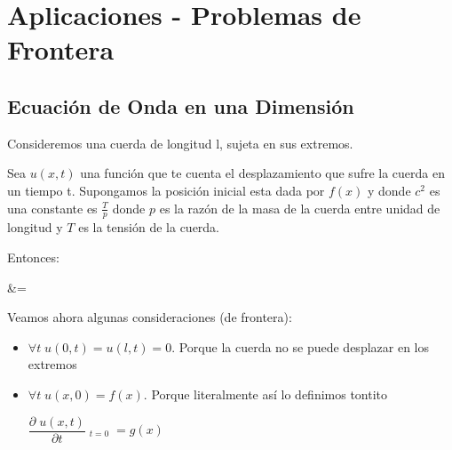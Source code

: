 \documentclass[12pt, fleqn]{report}                             %
\def \Eq {equation}                                             %
\newenvironment{MultiLineEquation*}[1]                          %
        {\begin{\Eq*}\begin{alignedat}{#1}}                         %
        {\end{alignedat}\end{\Eq*}}                                 %
\theoremstyle{break}                                            %
\newcommand \UpperDerivate[3] {\dfrac{d^{#3} \; #1}{d#2^{#3}}}  %
\newcommand \Partial[2] {\dfrac{\partial \; #1}{\partial #2}}   %
\newcommand \UpperPartial[3]                                    %
        {\dfrac{\partial^{#3} \; #1}{\partial#2^{#3}}}              %
\DeclareMathOperator \Evaluate  {\Big|}                         %
\begin{document}
        \clearpage
        \section{Aplicaciones - Problemas de Frontera}


            \subsection{Ecuación de Onda en una Dimensión}
                
                Consideremos una cuerda de longitud l, sujeta en sus extremos.

                Sea $u(x, t)$ una función que te cuenta el desplazamiento que
                sufre la cuerda en un tiempo t. Supongamos la posición 
                inicial esta dada por $f(x)$ y donde $c^2$ es una constante
                es $\frac{T}{p}$ donde $p$ es la razón de la masa de la cuerda
                entre unidad de longitud y $T$ es la tensión de la cuerda.

                Entonces:
                \begin{MultiLineEquation*}{3}
                    \UpperPartial{u(x, t)}{x}{2} 
                        &=  \; \UpperPartial{u(x, t)}{t}{2}
                \end{MultiLineEquation*}

                Veamos ahora algunas consideraciones (de frontera):
                \begin{itemize}
                    \item
                        $\forall t \; u(0, t) = u(l, t) = 0$. 
                        Porque la cuerda no se puede desplazar en los extremos
                    \item
                        $\forall t \; u(x, 0) = f(x)$. 
                        Porque literalmente así lo definimos tontito

                        $\Partial{u(x,t)}{t} \Evaluate_{t=0} = g(x)$
                \end{itemize}
\end{document}
